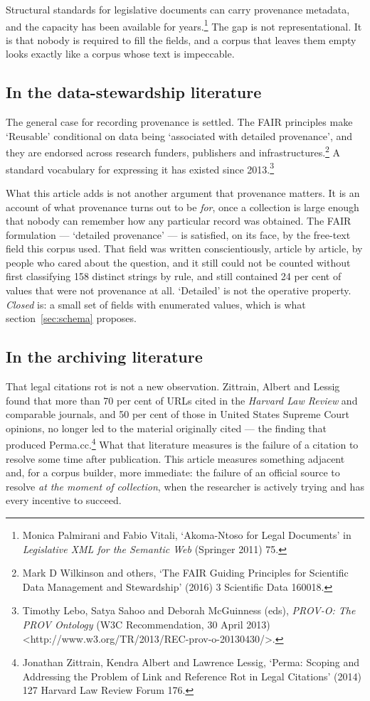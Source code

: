 \documentclass[11pt]{article}
\begin{document}
Structural standards for legislative documents can carry provenance metadata,
and the capacity has been available for years.\footnote{Monica Palmirani and
Fabio Vitali, `Akoma-Ntoso for Legal Documents' in \emph{Legislative XML for
the Semantic Web} (Springer 2011) 75.} The gap is not representational. It is
that nobody is required to fill the fields, and a corpus that leaves them empty
looks exactly like a corpus whose text is impeccable.

\subsection{In the data-stewardship literature}

The general case for recording provenance is settled. The FAIR principles make
`Reusable' conditional on data being `associated with detailed provenance', and
they are endorsed across research funders, publishers and
infrastructures.\footnote{Mark D Wilkinson and others, `The FAIR Guiding
Principles for Scientific Data Management and Stewardship' (2016) 3 Scientific
Data 160018.} A standard vocabulary for expressing it has existed since
2013.\footnote{Timothy Lebo, Satya Sahoo and Deborah McGuinness (eds),
\emph{PROV-O: The PROV Ontology} (W3C Recommendation, 30 April 2013)
\textless http://www.w3.org/TR/2013/REC-prov-o-20130430/\textgreater.}

What this article adds is not another argument that provenance matters. It is
an account of what provenance turns out to be \emph{for}, once a collection is
large enough that nobody can remember how any particular record was obtained.
The FAIR formulation --- `detailed provenance' --- is satisfied, on its face, by
the free-text field this corpus used. That field was written conscientiously,
article by article, by people who cared about the question, and it still could
not be counted without first classifying 158 distinct strings by rule, and
still contained 24 per cent of values that were not provenance at all. `Detailed'
is not the operative property. \emph{Closed} is: a small set of fields with
enumerated values, which is what section~\ref{sec:schema} proposes.

\subsection{In the archiving literature}

That legal citations rot is not a new observation. Zittrain, Albert and Lessig
found that more than 70 per cent of URLs cited in the \emph{Harvard Law Review}
and comparable journals, and 50 per cent of those in United States Supreme
Court opinions, no longer led to the material originally cited --- the finding
that produced Perma.cc.\footnote{Jonathan Zittrain, Kendra Albert and Lawrence
Lessig, `Perma: Scoping and Addressing the Problem of Link and Reference Rot in
Legal Citations' (2014) 127 Harvard Law Review Forum 176.} What that literature
measures is the failure of a citation to resolve some time after publication. This article measures
something adjacent and, for a corpus builder, more immediate: the failure of an
official source to resolve \emph{at the moment of collection}, when the
researcher is actively trying and has every incentive to succeed.
\end{document}
